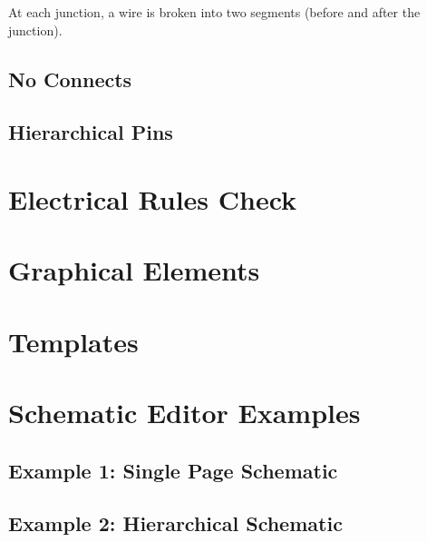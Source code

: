 At each junction, a wire is broken into two segments (before and after the junction).



\subsection{No Connects}
\subsection{Hierarchical Pins}

\section{Electrical Rules Check}

\section{Graphical Elements}

\section{Templates}

\section{Schematic Editor Examples}
\subsection{Example 1: Single Page Schematic}
\subsection{Example 2: Hierarchical Schematic}